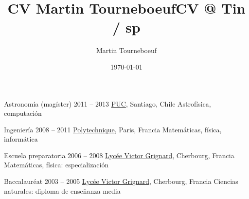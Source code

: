 \def\tbflanguage{spanish}

\ifx\HCode\undefined
  \providecommand\tbfbordertop{1.2}
  \providecommand\tbfborderleft{0.7}
  \providecommand\tbfwidth{12.4}
\else
  \providecommand\tbfbordertop{1}
  \providecommand\tbfborderleft{0.7}
  \providecommand\tbfwidth{12.4}
\fi

\ifx\HCode\undefined

%
\else

%
\fi

\ifx\HCode\undefined
  \title{CV Martin Tourneboeuf}
\else
  \title{CV @ Tin / sp}
\fi
\author{Martin Tourneboeuf}
\date{\today}









\begin{coordinatelist}
\end{coordinatelist}



\pgfmathsetmacro{\tbfyeary}{\tbfbordertop+3.1}

\begin{yearlist}[7.7][\tbfborderleft][\tbfyeary]


\item[Astronomía (magíster)]{2011 -- 2013}
  {
  \href{http://www.uc.cl/}{PUC}, Santiago, Chile
  }
  {    Astrofísica, computación}


\item[Ingeniería]{2008 -- 2011}
  {
  \tbfix
  \href{https://www.polytechnique.edu/}{Polytechnique}, Paris, Francia
  }
  {    Matemáticas, física, informática}


\item[Escuela preparatoria]{2006 -- 2008}
  {
  \href{http://www.lycee-grignard.fr/}{Lycée Victor Grignard}, Cherbourg, Francia
  }
  {    Matemáticas, física: especialización}


\item[Baccalaur\'eat]{2003 -- 2005}
  {
  \href{http://www.lycee-grignard.fr/}{Lycée Victor Grignard}, Cherbourg, Francia
  }
  {    Ciencias naturales: diploma de enseñanza media}

\end{yearlist}



